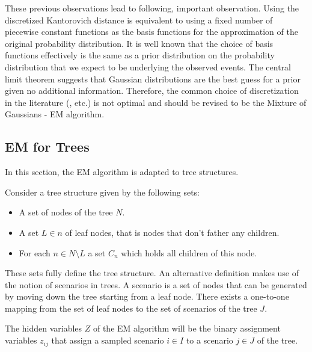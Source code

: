These previous observations lead to following, important observation.
Using the discretized Kantorovich distance is equivalent to using a fixed number of piecewise constant functions as the basis functions for the approximation of the original probability distribution.
It is well known that the choice of basis functions effectively is the same as a prior distribution on the probability distribution that we expect to be underlying the observed events.
The central limit theorem suggests that Gaussian distributions are the best guess for a prior given no additional information.
Therefore, the common choice of discretization in the literature (\cite{Dupacova2003}, etc.) is not optimal and should be revised to be the Mixture of Gaussians - EM algorithm.

\subsection{EM for Trees}
\label{sec:mixt-gauss-trees}
In this section, the EM algorithm is adapted to tree structures.

Consider a tree structure given by the following sets:
\begin{itemize}
\item A set of nodes of the tree $N$.
\item A set $L\in n$ of leaf nodes, that is nodes that don't father any children.
\item For each $n\in N\setminus L$ a set $C_n$ which holds all children of this node.
\end{itemize}
These sets fully define the tree structure.
An alternative definition makes use of the notion of scenarios in trees.
A scenario is a set of nodes that can be generated by moving down the tree starting from a leaf node.
There exists a one-to-one mapping from the set of leaf nodes to the set of scenarios of the tree $J$.

The hidden variables $Z$ of the EM algorithm will be the binary assignment variables $z_{ij}$ that
assign a sampled scenario $i\in I$ to a scenario $j\in J$ of the tree.

